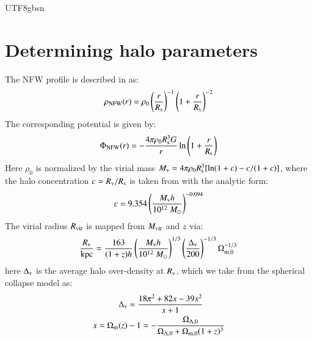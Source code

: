 \documentclass[trackchanges, twocolappendix, twocolumn]{aastex701}
\begin{document}
\begin{CJK*}{UTF8}{gbsn}
\section{Determining halo parameters}
\label{sec apdx}
The NFW profile is described in \citet{NFW} as:
\begin{align}
\rho_{\rm NFW} (r) = \rho_0 \left( \dfrac{r}{R_{\rm s}} \right)^{-1} \left( 1 + \dfrac{r}{R_{\rm s}} \right)^{-2} 
\end{align}
The corresponding potential is given by:
\begin{align}
\Phi_{\rm NFW} (r) = - \dfrac{4 \pi \rho_0 R_{\rm s}^3 G}{r} \ln \left( 1 + \dfrac{r}{R_{\rm s}} \right)
\end{align}
Here $\rho_0$ is normalized by the virial mass $M_{\rm v} = 4 \pi \rho_0 R_{\rm s}^3 [\ln (1 + c) - c/(1 + c)]$, where the halo concentration $c = R_{\rm v} / R_{\rm s}$ is taken from \citet{2008MNRAS.391.1940M} with the analytic form: 
\begin{align}
c = 9.354 \left( \dfrac{M_{\rm v} h}{10^{12}~M_{\odot}} \right)^{-0.094}
\end{align}
The virial radius $R_{\rm vir}$ is mapped from $M_{\rm vir}$ and $z$ via:
\begin{align}
\dfrac{R_{\rm v}}{\rm kpc} = \dfrac{163}{(1 + z) h} \left( \dfrac{M_{\rm v} h}{10^{12}~M_{\odot}} \right)^{1 / 3} \left( \dfrac{\Delta_{\rm v}}{200} \right)^{- 1 / 3} \Omega_{\rm m, 0}^{- 1 / 3}
\end{align}
here $\Delta_{\rm v}$ is the average halo over-density at $R_{\rm v}$, which we take from the spherical collapse model as:
\begin{align}
\Delta_{\rm v} & = \dfrac{18 \pi^2 + 82 x - 39 x^2}{x + 1} \\
x = \Omega_{\rm m}(z) & - 1 = - \dfrac{\Omega_{\Lambda, 0}}{\Omega_{\Lambda, 0} + \Omega_{\rm m, 0} (1 + z)^3}
\end{align}


{}




\end{CJK*}
\end{document}
